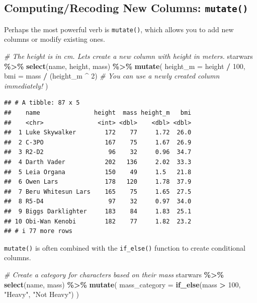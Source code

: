 \documentclass[
  11pt,
]{article}
\newenvironment{Shaded}{\begin{snugshade}}{\end{snugshade}}
\newcommand{\AttributeTok}[1]{\textcolor[rgb]{0.13,0.29,0.53}{#1}}
\newcommand{\CommentTok}[1]{\textcolor[rgb]{0.56,0.35,0.01}{\textit{#1}}}
\newcommand{\DecValTok}[1]{\textcolor[rgb]{0.00,0.00,0.81}{#1}}
\newcommand{\FunctionTok}[1]{\textcolor[rgb]{0.13,0.29,0.53}{\textbf{#1}}}
\newcommand{\NormalTok}[1]{#1}
\newcommand{\SpecialCharTok}[1]{\textcolor[rgb]{0.81,0.36,0.00}{\textbf{#1}}}
\newcommand{\StringTok}[1]{\textcolor[rgb]{0.31,0.60,0.02}{#1}}
\begin{document}
\subsection{\texorpdfstring{Computing/Recoding New Columns:
\texttt{mutate()}}{Computing/Recoding New Columns: mutate()}}\label{computingrecoding-new-columns-mutate}

Perhaps the most powerful verb is \texttt{mutate()}, which allows you to
add new columns or modify existing ones.

\begin{Shaded}
\begin{Highlighting}[]
\CommentTok{\# The \textquotesingle{}height\textquotesingle{} is in cm. Let\textquotesingle{}s create a new column with height in meters.}
\NormalTok{starwars }\SpecialCharTok{\%\textgreater{}\%} 
  \FunctionTok{select}\NormalTok{(name, height, mass) }\SpecialCharTok{\%\textgreater{}\%} 
  \FunctionTok{mutate}\NormalTok{(}
    \AttributeTok{height\_m =}\NormalTok{ height }\SpecialCharTok{/} \DecValTok{100}\NormalTok{,}
    \AttributeTok{bmi =}\NormalTok{ mass }\SpecialCharTok{/}\NormalTok{ (height\_m }\SpecialCharTok{\^{}} \DecValTok{2}\NormalTok{) }\CommentTok{\# You can use a newly created column immediately!}
\NormalTok{  )}
\end{Highlighting}
\end{Shaded}

\begin{verbatim}
## # A tibble: 87 x 5
##    name               height  mass height_m   bmi
##    <chr>               <int> <dbl>    <dbl> <dbl>
##  1 Luke Skywalker        172    77     1.72  26.0
##  2 C-3PO                 167    75     1.67  26.9
##  3 R2-D2                  96    32     0.96  34.7
##  4 Darth Vader           202   136     2.02  33.3
##  5 Leia Organa           150    49     1.5   21.8
##  6 Owen Lars             178   120     1.78  37.9
##  7 Beru Whitesun Lars    165    75     1.65  27.5
##  8 R5-D4                  97    32     0.97  34.0
##  9 Biggs Darklighter     183    84     1.83  25.1
## 10 Obi-Wan Kenobi        182    77     1.82  23.2
## # i 77 more rows
\end{verbatim}

\texttt{mutate()} is often combined with the \texttt{if\_else()}
function to create conditional columns.

\begin{Shaded}
\begin{Highlighting}[]
\CommentTok{\# Create a category for characters based on their mass}
\NormalTok{starwars }\SpecialCharTok{\%\textgreater{}\%}
  \FunctionTok{select}\NormalTok{(name, mass) }\SpecialCharTok{\%\textgreater{}\%}
  \FunctionTok{mutate}\NormalTok{(}
    \AttributeTok{mass\_category =} \FunctionTok{if\_else}\NormalTok{(mass }\SpecialCharTok{\textgreater{}} \DecValTok{100}\NormalTok{, }\StringTok{"Heavy"}\NormalTok{, }\StringTok{"Not Heavy"}\NormalTok{)}
\NormalTok{  )}
\end{Highlighting}
\end{Shaded}
\end{document}
